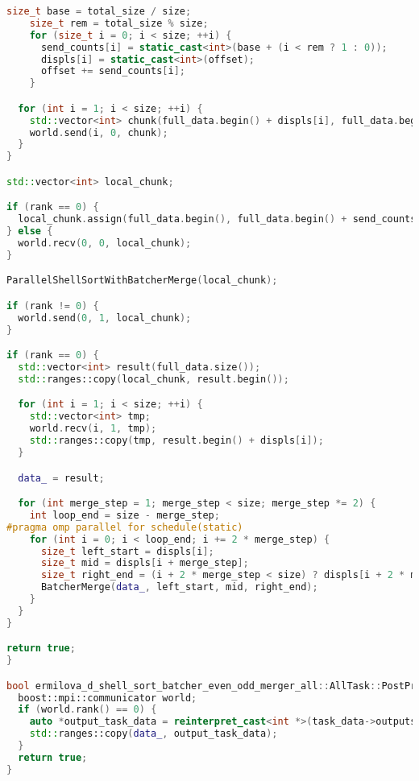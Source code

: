 \documentclass[a4paper,12pt]{article}
\begin{document}
\begin{lstlisting}[language=C++]
    size_t base = total_size / size;
    size_t rem = total_size % size;
    for (size_t i = 0; i < size; ++i) {
      send_counts[i] = static_cast<int>(base + (i < rem ? 1 : 0));
      displs[i] = static_cast<int>(offset);
      offset += send_counts[i];
    }

  for (int i = 1; i < size; ++i) {
    std::vector<int> chunk(full_data.begin() + displs[i], full_data.begin() + displs[i] + send_counts[i]);
    world.send(i, 0, chunk);
  }
}

std::vector<int> local_chunk;

if (rank == 0) {
  local_chunk.assign(full_data.begin(), full_data.begin() + send_counts[0]);
} else {
  world.recv(0, 0, local_chunk);
}

ParallelShellSortWithBatcherMerge(local_chunk);

if (rank != 0) {
  world.send(0, 1, local_chunk);
}

if (rank == 0) {
  std::vector<int> result(full_data.size());
  std::ranges::copy(local_chunk, result.begin());

  for (int i = 1; i < size; ++i) {
    std::vector<int> tmp;
    world.recv(i, 1, tmp);
    std::ranges::copy(tmp, result.begin() + displs[i]);
  }

  data_ = result;

  for (int merge_step = 1; merge_step < size; merge_step *= 2) {
    int loop_end = size - merge_step;
#pragma omp parallel for schedule(static)
    for (int i = 0; i < loop_end; i += 2 * merge_step) {
      size_t left_start = displs[i];
      size_t mid = displs[i + merge_step];
      size_t right_end = (i + 2 * merge_step < size) ? displs[i + 2 * merge_step] : data_.size();
      BatcherMerge(data_, left_start, mid, right_end);
    }
  }
}

return true;
}

bool ermilova_d_shell_sort_batcher_even_odd_merger_all::AllTask::PostProcessingImpl() {
  boost::mpi::communicator world;
  if (world.rank() == 0) {
    auto *output_task_data = reinterpret_cast<int *>(task_data->outputs[0]);
    std::ranges::copy(data_, output_task_data);
  }
  return true;
}
\end{lstlisting}
\end{document}

